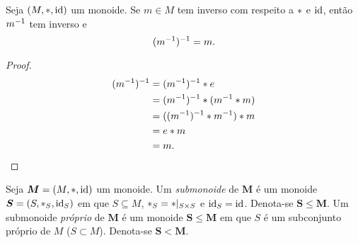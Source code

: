 \begin{prop}
Seja $(M,\ast,\mathrm{id})$ um monoide. Se $m \in M$ tem inverso com respeito a $\ast$ e $\mathrm{id}$, então $m^{-1}$ tem inverso e
	\begin{equation*}
	(m^{-1})^{-1}=m.
	\end{equation*}
\end{prop}
\begin{proof}
	\begin{equation*}
	\begin{split}
	(m^{-1})^{-1} &= (m^{-1})^{-1}  \ast  e \\
		&= (m^{-1})^{-1}  \ast  (m^{-1}  \ast  m) \\
		&= ((m^{-1})^{-1}  \ast  m^{-1})  \ast  m \\
		&= e  \ast  m \\
		&= m.
	\end{split}
	\end{equation*}
\end{proof}

\begin{defi}
Seja $\bm M=(M,\ast,\mathrm{id})$ um monoide. Um \emph{submonoide} de $\bm M$ é um monoide $\bm S=(S,\ast _S,\mathrm{id}_S)$ em que $S \subseteq M$, $\ast _S= \ast |_{S \times S}$ e $\mathrm{id}_S=\mathrm{id}$. Denota-se $\bm S \leq \bm M$. Um submonoide \emph{próprio} de $\bm M$ é um monoide $\bm S \leq \bm M$ em que $S$ é um subconjunto próprio de $M$ ($S \subset M$). Denota-se $\bm S < \bm M$.
\end{defi}

